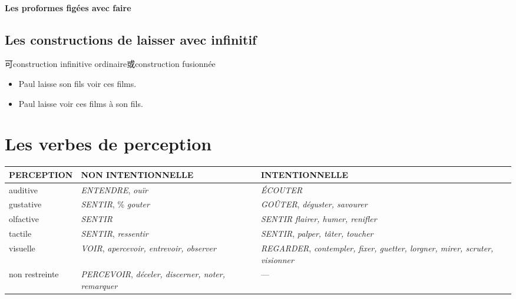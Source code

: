 \documentclass[UTF8]{report}
\begin{document}
\paragraph{Les proformes figées avec faire}


\subsection{Les constructions de laisser avec infinitif}
可construction infinitive ordinaire或construction fusionnée
\begin{itemize}
    \item Paul laisse son fils voir ces films.
    \item Paul laisse voir ces films à son fils.
\end{itemize}


\section{Les verbes de perception}


\begin{table}[H]
    \centering
    \begin{adjustbox}{max width = \textwidth}
        \begin{tabular}{|l|l|l|}
    \hline
    \rowcolor{cyan!20}
    \textbf{PERCEPTION} & \textbf{NON INTENTIONNELLE} & \textbf{INTENTIONNELLE} \\
    \hline
    auditive & \textit{ENTENDRE}, \textit{ouïr} & \textit{ÉCOUTER} \\
    \hline
    gustative & \textit{SENTIR}, \% \textit{gouter} &\textit{GOÛTER}, \textit{déguster, savourer}  \\
    \hline
    olfactive & \textit{SENTIR} & \textit{SENTIR}   \textit{flairer, humer, renifler} \\
    \hline
    tactile & \textit{SENTIR}, \textit{ressentir}  & \textit{SENTIR}, \textit{palper, tâter, toucher} \\
    \hline
    visuelle & \textit{VOIR}, \textit{apercevoir, entrevoir, observer} & \textit{REGARDER},   \textit{contempler, fixer, guetter, lorgner, mirer, scruter, visionner} \\
    \hline
    non restreinte & \textit{PERCEVOIR}, \textit{déceler, discerner, noter, remarquer} & \quad --- \\
    \hline
    \end{tabular}
    
    \end{adjustbox}
\end{table}
\end{document}
